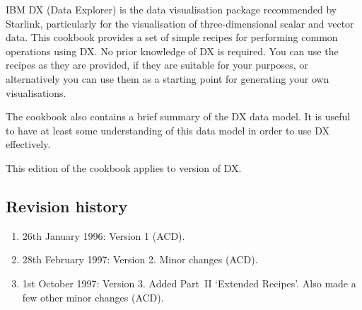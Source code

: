
IBM DX (Data Explorer) is the data visualisation package recommended by
Starlink, particularly for the visualisation of three-dimensional scalar
and vector data. This cookbook provides a set of simple recipes for
performing common operations using DX. No prior knowledge of DX is
required. You can use the recipes as they are provided, if they are
suitable for your purposes, or alternatively you can use them as a
starting point for generating your own visualisations.

The cookbook also contains a brief summary of the DX data model. It is
useful to have at least some understanding of this data model in order
to use DX effectively.

This edition of the cookbook applies to version \DXversion of DX.

 \newpage
 \begin{latexonly}
   \setlength{\parskip}{0mm}
   \latexonlytoc

   \newpage
   \listoftables
   \listoffigures

   \setlength{\parskip}{\medskipamount}
   \markboth{\stardocname}{\stardocname}
 \end{latexonly}

\vspace{2.5cm}

\subsection*{Revision history}

\begin{enumerate}

  \item 26th January 1996: Version 1 (ACD).

  \item 28th February 1997: Version 2.  Minor changes (ACD).

  \item 1st October 1997: Version 3. Added Part~II `Extended
   Recipes'.  Also made a few other minor changes (ACD).

\end{enumerate}

